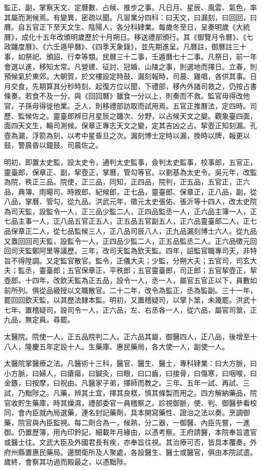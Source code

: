 監正、副，掌察天文、定曆數、占候、推步之事。凡日月、星辰、風雲、氣色，率其屬而測候焉。有變異，密疏以聞。凡習業分四科：曰天文，曰漏刻，曰回回，曰曆。自五官正下至天文生、陰陽人，各分科肄業。每歲冬至日，呈奏明歲《大統曆》，成化十五年改頒明歲歷於十月朔日。移送禮部頒行。其《御覽月令曆》、《七政躔度曆》、《六壬遁甲曆》、《四季天象錄》，並先期進呈。凡曆註，御曆註三十事，如祭祀、頒詔、行幸等類。民曆三十二事，壬遁曆七十二事。凡祭日，前一年會選以進，移知太常。凡營建、征討、冠婚、山陵之事，則選地而擇日。立春，則預候氣於東郊。大朝賀，於文樓設定時鼓、漏刻報時，司晨、雞唱，各供其事。日月交食，先期算其分秒時刻、起復方位以聞，下禮部，移內外諸司救之，仍按占書條奏。若食不及一分，與《回回曆》雖食一分以上，則奏而不救。監官毋得改他官，子孫毋得徙他業。乏人，則移禮部訪取而試用焉。五官正推曆法，定四時。司歷、監候佐之。靈臺郎辨日月星辰之躔次、分野，以占候天文之變。觀象臺四面，面四天文生，輪司測候。保章正專志天文之變，定其吉凶之占。挈壺正知刻漏。孔壺為漏，浮箭為刻，以考中星昏旦之次。漏刻博士定時以漏，換時以牌，報更以鼓，警晨昏以鐘鼓。司晨佐之。

明初，即置太史監，設太史令，通判太史監事，僉判太史監事，校事郎，五官正，靈臺郎，保章正、副，挈壺正，掌曆，管勾等官。以劉基為太史令。吳元年，改監為院，秩正三品。院使，正三品，同知，正四品，院判，正五品，五官正，正六品，典簿、雨暘司、時敘郎、紀候郎，正七品，靈臺郎、保章正，正八品，副，從八品，掌曆、管勾，從九品。洪武元年，徵元太史張佑、張沂等十四人，改太史院為司天監，設監令一人，正三品少監二人，正四品監丞一人，正六品主簿一人，正七品主事一人，正八品五官正五人，正五品五官副五人，正六品靈臺郎二人，正七品保章正二人，從七品監候三人，正八品司辰八人，正九品漏刻博士六人。從九品又置回回司天監，設監令一人，正四品少監二人，正五品監丞二人。正六品徵元回回司天監鄭阿里等議歷。三年，改司天監為欽天監。四年，詔監官職專司天，非特旨不得陞調。又定監官散官。監令，正儀大夫；少監，分朔大夫；五官司，司玄大夫；監丞，靈臺郎；五官保章正，平秩郎；五官靈臺郎，司正郎；五官挈壺正，挈壺郎。十四年，改欽天監為正五品，設令一人，丞一人，屬官五官正以下，員數如前所列。俱從品級授以文職散官。二十二年，改令為監正，丞為監副。三十一年，罷回回欽天監，以其歷法隸本監。明初，又置稽疑司，以掌卜筮，未幾罷。洪武十七年，置稽疑司，設司令一人，正六品，左、右丞各一人，從六品，屬官司筮，正九品，無定員。尋罷。

太醫院。院使一人，正五品院判二人。正六品其屬，御醫四人，正八品，後增至十八人，隆慶五年定設十人。生藥庫、惠民藥局，各大使一人，副使一人。

太醫院掌醫療之法。凡醫術十三科，醫官、醫生、醫士，專科肄業：曰大方脈，曰小方脈，曰婦人，曰瘡瘍，曰鍼灸，曰眼，曰口齒，曰接骨，曰傷寒，曰咽喉，曰金鏃，曰按摩，曰祝由。凡醫家子弟，擇師而教之。三年、五年一試、再試、三試，乃黜陟之。凡藥，辨其土宜，擇其良楛，慎其條製而用之。四方解納藥品，院官收貯生藥庫，時其燥濕，禮部委官一員稽察之。診視御脈，使、判、御醫參看校同，會內臣就內局選藥，連名封記藥劑，具本開寫藥性、證治之法以奏。烹調御藥，院官與內臣監視。每二劑合為一，候熟，分二器，一御醫、內臣先嘗，一進御。仍置歷簿，用內印鈐記，細載年月緣由，以憑考察。王府請醫，本院奉旨遣官或醫士往。文武大臣及外國君長有疾，亦奉旨往視。其治療可否，皆具本覆奏。外府州縣置惠民藥局。邊關衛所及人聚處，各設醫生、醫士或醫官，俱由本院試遣。歲終，會察其功過而殿最之，以憑黜陟。

